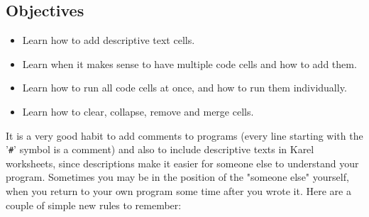 \subsection{Objectives} 
 
\begin{itemize}
\item Learn how to add descriptive text cells.
\item Learn when it makes sense to have multiple code cells and how to add them.
\item Learn how to run all code cells at once, and how to run them individually.
\item Learn how to clear, collapse, remove and merge cells.
\end{itemize}
It is a very good habit to add comments to programs (every line starting with the '{\tt \#}'
symbol is a comment) and also to include descriptive 
texts in Karel worksheets, since descriptions make it easier for someone else to 
understand your program. Sometimes you may be in the position of the "someone else" yourself,
when you return to your own program some time after you wrote it. Here are a couple of 
simple new rules to remember:
